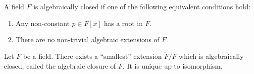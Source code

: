 \begin{prop-defn}
    A field \(F\) is algebraically closed if one of the following equivalent conditions hold:
    \begin{enumerate}
        \item Any non-constant \(p \in F[x]\) has a root in \(F\).
        \item There are no non-trivial algebraic extensions of \(F\).
    \end{enumerate}
\end{prop-defn}

\begin{theorem}
    Let \(F\) be a field. There exists a ``smallest'' extension \(\tilde{F} / F\) which is algebraically closed, called the algebraic closure of \(F\). It is unique up to isomorphism.
\end{theorem}